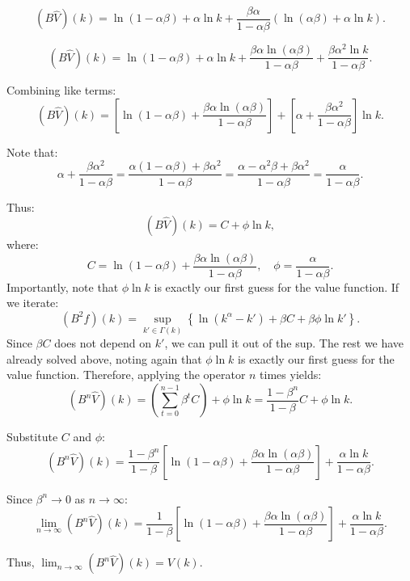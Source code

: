 \documentclass[11pt]{extarticle}
\theoremstyle{plain}
\theoremstyle{definition}
\begin{document}
\begin{enumerate}[(a)]
\begin{enumerate}[(a)]
\[
(B \hat{V})(k) = \ln(1 - \alpha \beta) + \alpha \ln k + \frac{\beta \alpha}{1 - \alpha \beta} \left( \ln (\alpha \beta) + \alpha \ln k \right).
\]

\[
(B \hat{V})(k) = \ln(1 - \alpha \beta) + \alpha \ln k + \frac{\beta \alpha \ln (\alpha \beta)}{1 - \alpha \beta} + \frac{\beta \alpha^2 \ln k}{1 - \alpha \beta}.
\]

Combining like terms:
\[
(B \hat{V})(k) = \left[ \ln(1 - \alpha \beta) + \frac{\beta \alpha \ln (\alpha \beta)}{1 - \alpha \beta} \right] + \left[ \alpha + \frac{\beta \alpha^2}{1 - \alpha \beta} \right] \ln k.
\]

Note that:
\[
\alpha + \frac{\beta \alpha^2}{1 - \alpha \beta} = \frac{\alpha (1 - \alpha \beta) + \beta \alpha^2}{1 - \alpha \beta} = \frac{\alpha - \alpha^2 \beta + \beta \alpha^2}{1 - \alpha \beta} = \frac{\alpha}{1 - \alpha \beta}.
\]

Thus:
\[
(B \hat{V})(k) = C + \phi \ln k,
\]
where:
\[
C = \ln(1 - \alpha \beta) + \frac{\beta \alpha \ln (\alpha \beta)}{1 - \alpha \beta}, \quad \phi = \frac{\alpha}{1 - \alpha \beta}.
\]
Importantly, note that $\phi \ln k$ is exactly our first guess for the value function. If we iterate:
\[
(B^2 f)(k) = \sup_{k' \in \Gamma(k)} \left\{ \ln (k^\alpha - k') + \beta C + \beta\phi \ln k' \right\}.
\]
Since $\beta C$ does not depend on $k'$, we can pull it out of the sup. The rest we have already solved above, noting again that $\phi \ln k$ is exactly our first guess for the value function. Therefore, applying the operator $n$ times yields:
\[
(B^n \hat{V})(k) = \left( \sum_{t=0}^{n-1} \beta^t C \right) + \phi \ln k = \frac{1 - \beta^n}{1 - \beta} C + \phi \ln k.
\]


Substitute $C$ and $\phi$:
\[
(B^n \hat{V})(k) = \frac{1 - \beta^n}{1 - \beta} \left[ \ln(1 - \alpha \beta) + \frac{\beta \alpha \ln (\alpha \beta)}{1 - \alpha \beta} \right] + \frac{\alpha \ln k}{1 - \alpha \beta}.
\]

Since $\beta^n \to 0$ as $n \to \infty$:
\[
\lim_{n \to \infty} (B^n \hat{V})(k) = \frac{1}{1 - \beta} \left[ \ln(1 - \alpha \beta) + \frac{\beta \alpha \ln (\alpha \beta)}{1 - \alpha \beta} \right] + \frac{\alpha \ln k}{1 - \alpha \beta}.
\]

Thus, $\lim_{n \to \infty} (B^n \hat{V})(k) = V(k)$.


\end{enumerate}



\vspace{10mm}

\end{enumerate}
\end{document}
